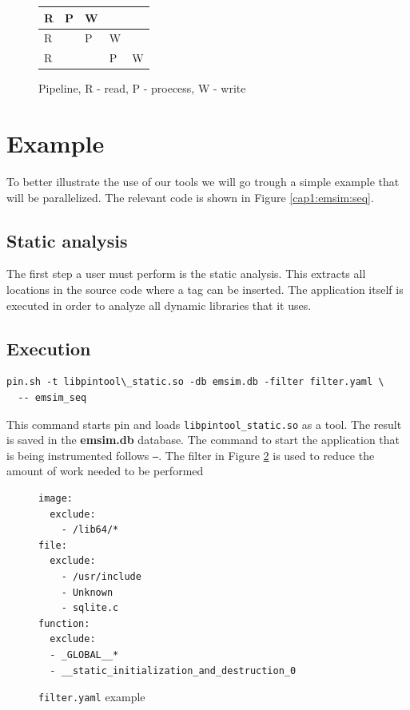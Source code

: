 \begin{figure}[!ht]
	\centering
	\begin{tabular}{ l | l | l | l | l}
		R & P & W & & \\
		\hline
		R &  & P & W & \\
		\hline
		R &  & & P & W \\
	\end{tabular}
	\caption{Pipeline, R - read, P - proecess, W - write}
	\label{cap1:pipeline}
\end{figure}

\section {Example}

To better illustrate the use of our tools we will go trough a simple example that will be parallelized. The relevant code is shown in Figure \ref{cap1:emsim:seq}.

\subsection {Static analysis}

The first step a user must perform is the static analysis. This extracts all locations in the source code where a tag can be inserted. The application itself is executed in order to analyze all dynamic libraries that it uses.

\subsection{Execution}

\begin{lstlisting}[style=BashInputStyle]
pin.sh -t libpintool\_static.so -db emsim.db -filter filter.yaml \
  -- emsim_seq
\end{lstlisting}

This command starts pin and loads \texttt{libpintool\_static.so} as a tool. The result is saved in the \textbf{emsim.db} database. The command to start the application that is being instrumented follows \texttt{--}. The filter in Figure \ref{cap1:filter} is used to reduce the amount of work needed to be performed

\begin{figure}
	\begin{center}
		\begin{verbatim}
image:
  exclude:
    - /lib64/*
file:
  exclude:
    - /usr/include
    - Unknown
    - sqlite.c
function:
  exclude:
  - _GLOBAL__*
  - __static_initialization_and_destruction_0
		\end{verbatim}
	\end{center}
	\caption{\texttt{filter.yaml} example}
	\label{cap1:filter}
\end{figure}

